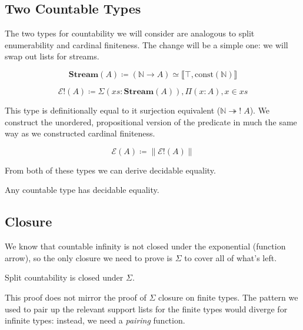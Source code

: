 \subsection{Two Countable Types}
The two types for countability we will consider are analogous to split
enumerability and cardinal finiteness.
The change will be a simple one: we will swap out lists for streams.
\begin{romdefinition}[Streams]
  \begin{equation}
    \mathbf{Stream}(A) \coloneqq (\mathbb{N} \rightarrow A)
    \simeq \llbracket \top , \text{const}(\mathbb{N}) \rrbracket
  \end{equation}
\end{romdefinition}
\begin{romdefinition}
  \begin{equation}
    \mathcal{E}!(A) \coloneqq \Sigma {(\mathit{xs} : \mathbf{Stream}(A))} , \Pi {(x : A)} , x \in \mathit{xs}
  \end{equation}
\end{romdefinition}
This type is definitionally equal to it surjection equivalent (\(\mathbb{N}
\twoheadrightarrow ! \; A\)).
We construct the unordered, propositional version of the predicate in much the
same way as we constructed cardinal finiteness.
\begin{romdefinition}[Countability]
  \begin{equation}
    \mathcal{E}(A) \coloneqq \lVert \mathcal{E}!(A) \rVert
  \end{equation}
\end{romdefinition}

From both of these types we can derive decidable equality.
\begin{romlemma}
  Any countable type has decidable equality.
\end{romlemma}
\subsection{Closure}
We know that countable infinity is not closed under the exponential (function
arrow), so the only closure we need to prove is \(\Sigma\) to cover all of
what's left.
\begin{romtheorem} \label{split-countability-sigma}
  Split countability is closed under \(\Sigma\).
\end{romtheorem}
This proof does not mirror the proof of \(\Sigma\) closure on finite types.
The pattern we used to pair up the relevant support lists for the finite types
would diverge for infinite types: instead, we need a \emph{pairing} function.

